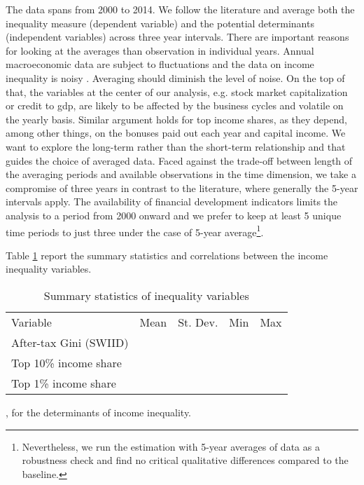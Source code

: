 \documentclass[a4paper,11pt]{article}
\begin{document}
The data spans from 2000 to 2014. We follow the literature \citep{dabla2015causes,de2017finance} and average both the inequality measure (dependent variable) and the potential determinants (independent variables) across three year intervals. There are important reasons for looking at the averages than observation in individual years. Annual macroeconomic data are subject to fluctuations and the data on income inequality is noisy \citet{delis2014}. Averaging should diminish the level of noise. On the top of that, the variables at the center of our analysis, e.g. stock market capitalization or credit to \ac{gdp}, are likely to be affected by the business cycles and volatile on the yearly basis. Similar argument holds for top income shares, as they depend, among other things, on the bonuses paid out each year and capital income. We want to explore the long-term rather than the short-term relationship and that guides the choice of averaged data. Faced against the trade-off between length of the averaging periods and available observations in the time dimension, we take a compromise of three years in contrast to the literature, where generally the 5-year intervals apply. The availability of financial development indicators limits the analysis to a period from 2000 onward and we prefer to keep at least 5 unique time periods to just three under the case of 5-year average\footnote{Nevertheless, we run the estimation with 5-year averages of data as a robustness check and find no critical qualitative differences compared to the baseline.}.

Table \ref{tab:ineq} report the summary statistics and correlations between the income inequality variables.

\begin{table}[ht!]
    \small
    \caption{Summary statistics of inequality variables}
    \label{tab:ineq}
    \centering
       \begin{tabular}{lrrrr}
        \toprule
        Variable & Mean & St. Dev. & Min & Max \\
        After-tax Gini (SWIID) & & & & \\
        Top 10\% income share & & & & \\
        Top 1\% income share & & & & \\
        \bottomrule
    \end{tabular}
\end{table}

\cite{roineetal2009}, \citet{furceri2019robust} for the determinants of income inequality.
\end{document}
